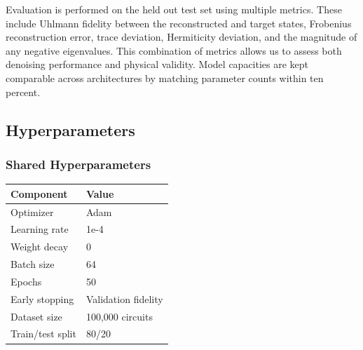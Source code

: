 \documentclass[11pt]{article}
\begin{document}
Evaluation is performed on the held out test set using multiple metrics. These include Uhlmann fidelity between the reconstructed and target states, Frobenius reconstruction error, trace deviation, Hermiticity deviation, and the magnitude of any negative eigenvalues. This combination of metrics allows us to assess both denoising performance and physical validity. Model capacities are kept comparable across architectures by matching parameter counts within ten percent.
\subsection{Hyperparameters}
\label{sec:org1e1183e}

\subsubsection{Shared Hyperparameters}
\label{sec:orgb25e2e5}

\begin{center}
\begin{tabular}{ll}
Component & Value\\
\hline
Optimizer & Adam\\
Learning rate & 1e-4\\
Weight decay & 0\\
Batch size & 64\\
Epochs & 50\\
Early stopping & Validation fidelity\\
Dataset size & 100,000 circuits\\
Train/test split & 80/20\\
\end{tabular}
\end{center}
\end{document}
